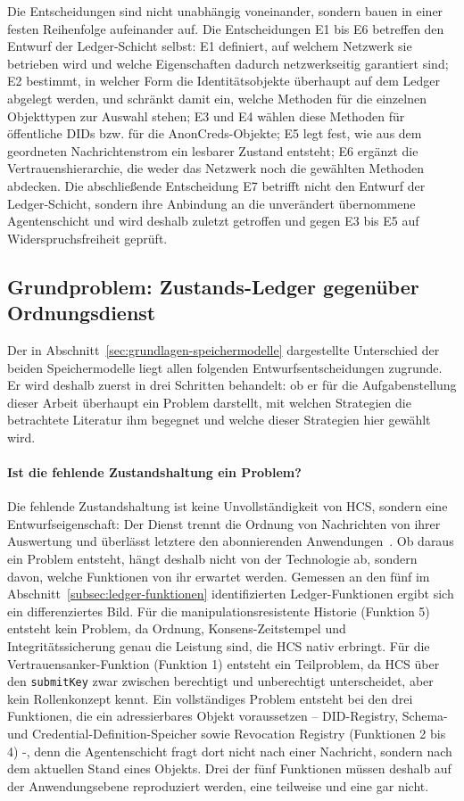 Die Entscheidungen sind nicht unabhängig voneinander, sondern bauen in einer festen Reihenfolge aufeinander auf. Die Entscheidungen E1 bis E6 betreffen den Entwurf der Ledger-Schicht selbst: E1 definiert, auf welchem Netzwerk sie betrieben wird und welche Eigenschaften dadurch netzwerkseitig garantiert sind; E2 bestimmt, in welcher Form die Identitätsobjekte überhaupt auf dem Ledger abgelegt werden, und schränkt damit ein, welche Methoden für die einzelnen Objekttypen zur Auswahl stehen; E3 und E4 wählen diese Methoden für öffentliche DIDs bzw. für die AnonCreds-Objekte; E5 legt fest, wie aus dem geordneten Nachrichtenstrom ein lesbarer Zustand entsteht; E6 ergänzt die Vertrauenshierarchie, die weder das Netzwerk noch die gewählten Methoden abdecken. Die abschließende Entscheidung E7 betrifft nicht den Entwurf der Ledger-Schicht, sondern ihre Anbindung an die unverändert übernommene Agentenschicht und wird deshalb zuletzt getroffen und gegen E3 bis E5 auf Widerspruchsfreiheit geprüft.


\subsection{Grundproblem: Zustands-Ledger gegenüber Ordnungsdienst}
\label{subsec:grundproblem-state-vs-ordering}

Der in Abschnitt~\ref{sec:grundlagen-speichermodelle} dargestellte Unterschied der beiden Speichermodelle liegt allen folgenden Entwurfsentscheidungen zugrunde. Er wird deshalb zuerst in drei Schritten behandelt: ob er für die Aufgabenstellung dieser Arbeit überhaupt ein Problem darstellt, mit welchen Strategien die betrachtete Literatur ihm begegnet und welche dieser Strategien hier gewählt wird.

\paragraph{Ist die fehlende Zustandshaltung ein Problem?}
Die fehlende Zustandshaltung ist keine Unvollständigkeit von HCS, sondern eine Entwurfseigenschaft: Der Dienst trennt die Ordnung von Nachrichten von ihrer Auswertung und überlässt letztere den abonnierenden Anwendungen~\cite{bairdgross2019}. Ob daraus ein Problem entsteht, hängt deshalb nicht von der Technologie ab, sondern davon, welche Funktionen von ihr erwartet werden. Gemessen an den fünf im Abschnitt~\ref{subsec:ledger-funktionen} identifizierten Ledger-Funktionen ergibt sich ein differenziertes Bild. Für die manipulationsresistente Historie (Funktion 5) entsteht kein Problem, da Ordnung, Konsens-Zeitstempel und Integritätssicherung genau die Leistung sind, die HCS nativ erbringt. Für die Vertrauensanker-Funktion (Funktion 1) entsteht ein Teilproblem, da HCS über den \texttt{submitKey} zwar zwischen berechtigt und unberechtigt unterscheidet, aber kein Rollenkonzept kennt. Ein vollständiges Problem entsteht bei den drei Funktionen, die ein adressierbares Objekt voraussetzen -- DID-Registry, Schema- und Credential-Definition-Speicher sowie Revocation Registry (Funktionen 2 bis 4) -, denn die Agentenschicht fragt dort nicht nach einer Nachricht, sondern nach dem aktuellen Stand eines Objekts. Drei der fünf Funktionen müssen deshalb auf der Anwendungsebene reproduziert werden, eine teilweise und eine gar nicht.

